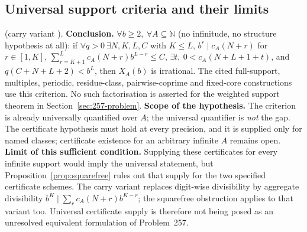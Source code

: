 \subsection{Universal support criteria and their limits}

\begin{obs}
(carry variant ).
\textbf{Conclusion.} $\forall b\ge2,\ \forall A\subseteq\mathbb N$ (no infinitude, no structure
hypothesis at all): if $\forall q>0\ \exists N,K,L,C$ with $K\le L$, $b^r \mid
c_{A}(N{+}r)$ for $r\in[1,K]$, $\sum_{r=K+1}^L c_{A}(N{+}r)
b^{L-r}\le C$, $\exists t,\ 0<c_{A}(N{+}L{+}1{+}t)$, and $q(C{+}N{+}L{+}2)<b^L$,
then $X_{A}(b)$ is irrational. The cited full-support, multiples, periodic, residue-class,
pairwise-coprime and fixed-core constructions use this criterion.  No
such factorisation is asserted for the weighted support theorem in
Section~\ref{sec:257-problem}.
\textbf{Scope of the hypothesis.} The criterion is already universally quantified over $A$;
the universal quantifier is \emph{not} the gap.  The certificate hypothesis must hold at every
precision, and it is supplied only for named classes; certificate existence for an arbitrary
infinite $A$ remains open.
\textbf{Limit of this sufficient condition.} Supplying these
certificates for every infinite support would imply the universal
statement, but Proposition~\ref{prop:squarefree} rules out that supply
for the two specified certificate schemes.  The carry variant replaces
digit-wise divisibility by aggregate divisibility
$b^K\mid\sum_r c_A(N+r)b^{K-r}$; the squarefree obstruction applies to
that variant too.  Universal certificate supply is therefore not being
posed as an unresolved equivalent formulation of Problem~257.
\end{obs}

